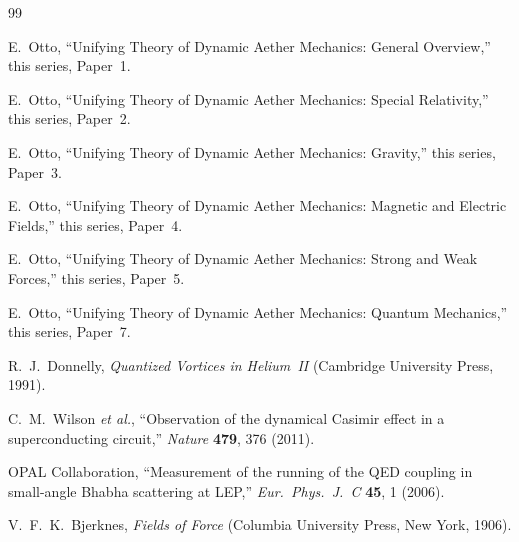 \documentclass[12pt,letterpaper]{article}
\begin{document}
\begin{thebibliography}{99}

E.~Otto,
``Unifying Theory of Dynamic Aether Mechanics: General Overview,''
this series, Paper~1.

E.~Otto,
``Unifying Theory of Dynamic Aether Mechanics: Special Relativity,''
this series, Paper~2.

E.~Otto,
``Unifying Theory of Dynamic Aether Mechanics: Gravity,''
this series, Paper~3.

E.~Otto,
``Unifying Theory of Dynamic Aether Mechanics: Magnetic and Electric Fields,''
this series, Paper~4.

E.~Otto,
``Unifying Theory of Dynamic Aether Mechanics: Strong and Weak Forces,''
this series, Paper~5.

E.~Otto,
``Unifying Theory of Dynamic Aether Mechanics: Quantum Mechanics,''
this series, Paper~7.

R.~J.~Donnelly,
\textit{Quantized Vortices in Helium~II}
(Cambridge University Press, 1991).

C.~M.~Wilson \textit{et al.},
``Observation of the dynamical Casimir effect in a superconducting circuit,''
\textit{Nature} \textbf{479}, 376 (2011).

OPAL Collaboration,
``Measurement of the running of the QED coupling in small-angle Bhabha
scattering at LEP,''
\textit{Eur.\ Phys.\ J.\ C} \textbf{45}, 1 (2006).

V.~F.~K.~Bjerknes,
\textit{Fields of Force}
(Columbia University Press, New York, 1906).

\end{thebibliography}
\end{document}
